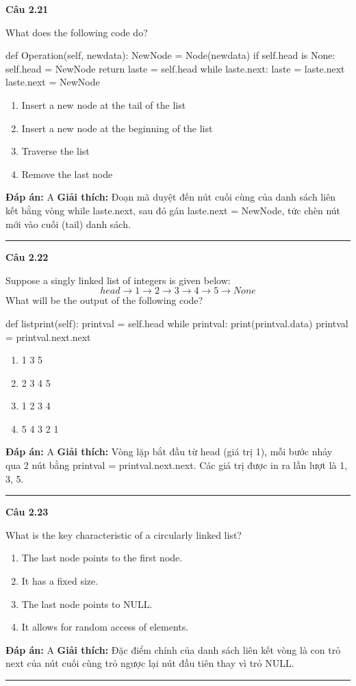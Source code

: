 \documentclass[11pt,a4paper]{article}
\newenvironment{question}[1]{%
  \par\vspace{1em}\noindent\textbf{\large Câu #1}\par\vspace{0.4em}
}{%
  \par\vspace{1em}\hrule\vspace{0.6em}
}
\newenvironment{choices}{%
  \begin{enumerate}[label=\textbf{\Alph*.},leftmargin=2.2em,itemsep=2pt,topsep=3pt]
}{%
  \end{enumerate}
}
\newcommand{\choice}{\item}
\newenvironment{codebox}{%
  \begin{tcolorbox}[colback=gray!8!white,colframe=gray!50!black,arc=1.5mm,boxrule=0.6pt,left=3mm,right=3mm,top=2.5mm,bottom=2.5mm]
  \ttfamily\small
}{%
  \end{tcolorbox}
}
\begin{document}
\begin{question}{2.21}
What does the following code do?
\begin{codebox}
def Operation(self, newdata):
    NewNode = Node(newdata)
    if self.head is None:
        self.head = NewNode
        return
    laste = self.head
    while laste.next:
        laste = laste.next
    laste.next = NewNode
\end{codebox}
\begin{choices}
\choice Insert a new node at the tail of the list
\choice Insert a new node at the beginning of the list
\choice Traverse the list
\choice Remove the last node
\end{choices}
\textbf{Đáp án:} A
\textbf{Giải thích:} Đoạn mã duyệt đến nút cuối cùng của danh sách liên kết bằng vòng while laste.next, sau đó gán laste.next = NewNode, tức chèn nút mới vào cuối (tail) danh sách.
\end{question}

\begin{question}{2.22}
Suppose a singly linked list of integers is given below:
$$head → 1 → 2 → 3 → 4 → 5 → None$$
What will be the output of the following code?
\begin{codebox}
def listprint(self):
    printval = self.head
    while printval:
        print(printval.data)
        printval = printval.next.next
\end{codebox}
\begin{choices}
\choice 1 3 5
\choice 2 3 4 5
\choice 1 2 3 4
\choice 5 4 3 2 1
\end{choices}
\textbf{Đáp án:} A
\textbf{Giải thích:} Vòng lặp bắt đầu từ head (giá trị 1), mỗi bước nhảy qua 2 nút bằng printval = printval.next.next. Các giá trị được in ra lần lượt là 1, 3, 5.
\end{question}

\begin{question}{2.23}
What is the key characteristic of a circularly linked list?
\begin{choices}
\choice The last node points to the first node.
\choice It has a fixed size.
\choice The last node points to NULL.
\choice It allows for random access of elements.
\end{choices}
\textbf{Đáp án:} A
\textbf{Giải thích:} Đặc điểm chính của danh sách liên kết vòng là con trỏ next của nút cuối cùng trỏ ngược lại nút đầu tiên thay vì trỏ NULL.
\end{question}
\end{document}
